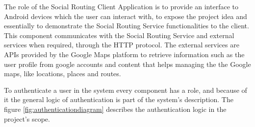         The role of the Social Routing Client Application is to provide an interface to Android \cite{androiddocs} devices which the user can interact with, to expose the project 
        idea and essentially to demonstrate the Social Routing Service functionalities to the client. This component communicates with the Social Routing Service and 
        external services when required, through the HTTP protocol. The external services are APIs provided by the Google Maps platform \cite{googlemapsplatform} 
        to retrieve information such as the user profile from google accounts and content that helps managing the the Google maps, like locations, places and routes. 

        To authenticate a user in the system every component has a role, and because of it the general
        logic of authentication is part of the system's description. The figure \ref{fig:authenticationdiagram} describes the authentication logic in
        the project's scope.
        \newpage
        
